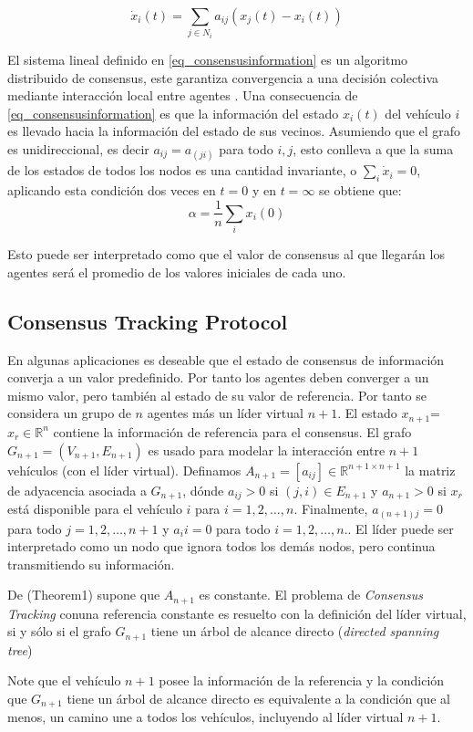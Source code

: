 \begin{equation}
\dot{x}_i(t)=\sum_{j\in N_i}a_{ij}(x_j(t)-x_i(t))
\label{eq_consensusinformation}
\end{equation}

El sistema lineal definido en \ref{eq_consensusinformation} es un algoritmo distribuido de consensus, este garantiza convergencia a una decisión colectiva mediante interacción local entre agentes \cite{DistributedConsensusinMulti} \cite{Olfati-saber07consensusand} \cite{Ordonez2014} \cite{Decentralized_adaptive_scheduling}.
Una consecuencia de \ref{eq_consensusinformation} es que la información del estado $x_i(t)$ del vehículo $i$ es llevado hacia la información del estado de sus vecinos.
Asumiendo que el grafo es unidireccional, es decir $a_{ij}=a_(ji)$ para todo $i,j$, esto conlleva a que la suma de los estados de todos los nodos es una cantidad invariante, o $\sum_i\dot{x}_i=0$, aplicando esta condición dos veces en $t=0$ y en $t=\infty$ se obtiene que:
\begin{equation}
\alpha=\frac{1}{n}\sum_{i}x_i(0)
\end{equation}

Esto puede ser interpretado como que el valor de consensus al que llegarán los agentes será el promedio de los valores iniciales de cada uno.


\subsection{Consensus Tracking Protocol}
En algunas aplicaciones es deseable que el estado de consensus de información converja a un valor predefinido. Por tanto los agentes deben converger a un mismo valor, pero también al estado de su valor de referencia. Por tanto se considera un grupo de $n$ agentes más un líder virtual $n+1$. El estado $x_{n+1}$=$x_r \in \mathbb{R}^n$ contiene la información de referencia para el consensus.
El grafo $G_{n+1}=(V_{n+1},E_{n+1})$ es usado para modelar la interacción entre $n+1$ vehículos (con el líder virtual). Definamos $A_{n+1}=[a_{ij}] \in \mathbb{R}^{n+1\times n+1}$ la matriz de adyacencia asociada a $G_{n+1}$, dónde $a_{ij}>0$ si $(j,i)\in E_{n+1}$ y $a_{n+1}>0$ si $x_r$ está disponible para el vehículo $i$ para $i=1,2,\ldots,n$. Finalmente, $a_{(n+1)j}=0$ para todo $j=1,2,\ldots,n+1$ y $a_ii=0$ para todo $i=1,2,\ldots,n.$. El líder puede ser interpretado como un nodo que ignora todos los demás nodos, pero continua transmitiendo su información.

De \cite{Ordonez2014}(Theorem1) supone que $A_{n+1}$ es constante. El problema de \textit{Consensus Tracking} conuna referencia constante es resuelto con la definición del líder virtual, si y sólo si el grafo $G_{n+1}$ tiene un árbol de alcance directo (\textit{directed spanning tree})

Note que el vehículo $n+1$ posee la información de la referencia y la condición que $G_{n+1}$ tiene un árbol de alcance directo es equivalente a la condición que al menos, un camino une a todos los vehículos, incluyendo al líder virtual $n+1$.




